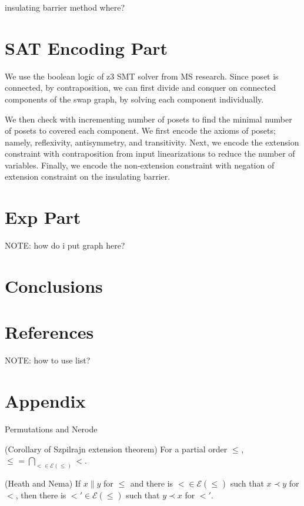 \documentclass[12pt]{llncs}
\let\oldleq\leq
\let\covered\prec
\let\incomp\parallel
\renewcommand{\leq}[1][]{\oldleq_{#1}}
\begin{document}
\begin{theorem}
    insulating barrier method where?
\end{theorem}

\section{SAT Encoding Part}
We use the boolean logic of z3 SMT solver from MS research. Since poset is connected, by contraposition, we can first divide and conquer on connected components of the swap graph, by solving each component individually.

We then check with incrementing number of posets to find the minimal number of posets to covered each component. We first encode the axioms of posets; namely, reflexivity, antisymmetry, and transitivity. Next, we encode the extension constraint with contraposition from input linearizations to reduce the number of variables. Finally, we encode the non-extension constraint with negation of extension constraint on the insulating barrier.

\section{Exp Part}
NOTE: how do i put graph here?

\section{Conclusions}

\section{References}
NOTE: how to use list?

\section{Appendix}

\begin{theorem}
    Permutations and Nerode
\end{theorem}

\begin{theorem}
    (Corollary of Szpilrajn extension theorem) For a partial order $\leq$, $\leq = \bigcap_{< \in \mathcal{E}(\leq)} <$.
\end{theorem}

\begin{theorem}
    (Heath and Nema) If $x \incomp y$ for $\leq$ and there is $< \in \mathcal{E}(\leq)$ such that $x \covered y$ for $<$, then there is $<' \in \mathcal{E}(\leq)$ such that $y \covered x$ for $<'$.
\end{theorem}
\end{document}
